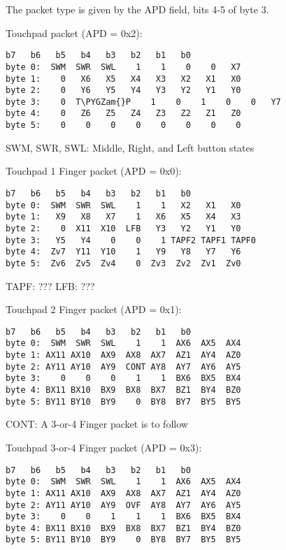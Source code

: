\documentclass[a4paper,8pt,english]{sphinxmanual}
\def\PYGZam{\char`\&}
\begin{document}
The packet type is given by the APD field, bits 4-5 of byte 3.

Touchpad packet (APD = 0x2):

\begin{Verbatim}[commandchars=\\\{\}]
          b7   b6   b5   b4   b3   b2   b1   b0
byte 0:  SWM  SWR  SWL    1    1    0    0   X7
byte 1:    0   X6   X5   X4   X3   X2   X1   X0
byte 2:    0   Y6   Y5   Y4   Y3   Y2   Y1   Y0
byte 3:    0  T\PYGZam{}P    1    0    1    0    0   Y7
byte 4:    0   Z6   Z5   Z4   Z3   Z2   Z1   Z0
byte 5:    0    0    0    0    0    0    0    0
\end{Verbatim}

SWM, SWR, SWL: Middle, Right, and Left button states

Touchpad 1 Finger packet (APD = 0x0):

\begin{Verbatim}[commandchars=\\\{\}]
          b7   b6   b5   b4   b3   b2   b1   b0
byte 0:  SWM  SWR  SWL    1    1   X2   X1   X0
byte 1:   X9   X8   X7    1   X6   X5   X4   X3
byte 2:    0  X11  X10  LFB   Y3   Y2   Y1   Y0
byte 3:   Y5   Y4    0    0    1 TAPF2 TAPF1 TAPF0
byte 4:  Zv7  Y11  Y10    1   Y9   Y8   Y7   Y6
byte 5:  Zv6  Zv5  Zv4    0  Zv3  Zv2  Zv1  Zv0
\end{Verbatim}

TAPF: ???
LFB:  ???

Touchpad 2 Finger packet (APD = 0x1):

\begin{Verbatim}[commandchars=\\\{\}]
          b7   b6   b5   b4   b3   b2   b1   b0
byte 0:  SWM  SWR  SWL    1    1  AX6  AX5  AX4
byte 1: AX11 AX10  AX9  AX8  AX7  AZ1  AY4  AZ0
byte 2: AY11 AY10  AY9  CONT AY8  AY7  AY6  AY5
byte 3:    0    0    0    1    1  BX6  BX5  BX4
byte 4: BX11 BX10  BX9  BX8  BX7  BZ1  BY4  BZ0
byte 5: BY11 BY10  BY9    0  BY8  BY7  BY5  BY5
\end{Verbatim}

CONT: A 3-or-4 Finger packet is to follow

Touchpad 3-or-4 Finger packet (APD = 0x3):

\begin{Verbatim}[commandchars=\\\{\}]
          b7   b6   b5   b4   b3   b2   b1   b0
byte 0:  SWM  SWR  SWL    1    1  AX6  AX5  AX4
byte 1: AX11 AX10  AX9  AX8  AX7  AZ1  AY4  AZ0
byte 2: AY11 AY10  AY9  OVF  AY8  AY7  AY6  AY5
byte 3:    0    0    1    1    1  BX6  BX5  BX4
byte 4: BX11 BX10  BX9  BX8  BX7  BZ1  BY4  BZ0
byte 5: BY11 BY10  BY9    0  BY8  BY7  BY5  BY5
\end{Verbatim}
\end{document}
